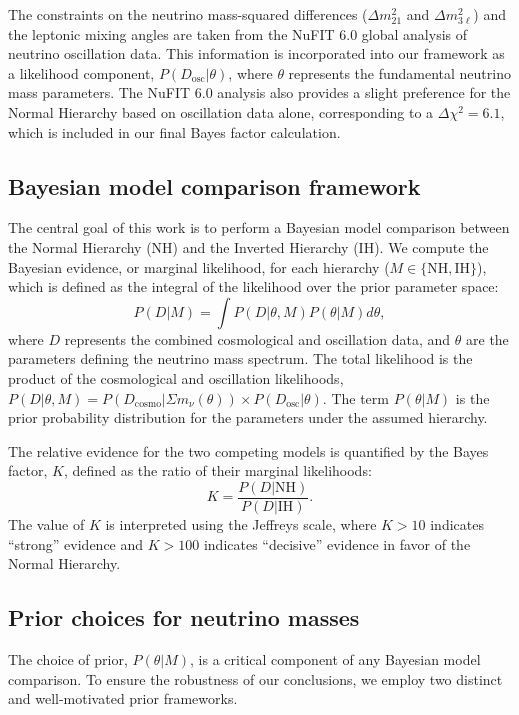 \documentclass[]{article}
\begin{document}
The constraints on the neutrino mass-squared differences ($\Delta m^2_{21}$ and $\Delta m^2_{3\ell}$) and the leptonic mixing angles are taken from the NuFIT 6.0 global analysis of neutrino oscillation data. This information is incorporated into our framework as a likelihood component, $P(D_{\text{osc}}|\theta)$, where $\theta$ represents the fundamental neutrino mass parameters. The NuFIT 6.0 analysis also provides a slight preference for the Normal Hierarchy based on oscillation data alone, corresponding to a $\Delta\chi^2 = 6.1$, which is included in our final Bayes factor calculation.

\subsection{Bayesian model comparison framework}
The central goal of this work is to perform a Bayesian model comparison between the Normal Hierarchy (NH) and the Inverted Hierarchy (IH). We compute the Bayesian evidence, or marginal likelihood, for each hierarchy ($M \in \{\text{NH}, \text{IH}\}$), which is defined as the integral of the likelihood over the prior parameter space:
\begin{equation}
P(D|M) = \int P(D|\theta, M) P(\theta|M) d\theta,
\end{equation}
where $D$ represents the combined cosmological and oscillation data, and $\theta$ are the parameters defining the neutrino mass spectrum. The total likelihood is the product of the cosmological and oscillation likelihoods, $P(D|\theta, M) = P(D_{\text{cosmo}}|\Sigma m_\nu(\theta)) \times P(D_{\text{osc}}|\theta)$. The term $P(\theta|M)$ is the prior probability distribution for the parameters under the assumed hierarchy.

The relative evidence for the two competing models is quantified by the Bayes factor, $K$, defined as the ratio of their marginal likelihoods:
\begin{equation}
K = \frac{P(D|\text{NH})}{P(D|\text{IH})}.
\end{equation}
The value of $K$ is interpreted using the Jeffreys scale, where $K > 10$ indicates ``strong'' evidence and $K > 100$ indicates ``decisive'' evidence in favor of the Normal Hierarchy.

\subsection{Prior choices for neutrino masses}
The choice of prior, $P(\theta|M)$, is a critical component of any Bayesian model comparison. To ensure the robustness of our conclusions, we employ two distinct and well-motivated prior frameworks.
\end{document}
